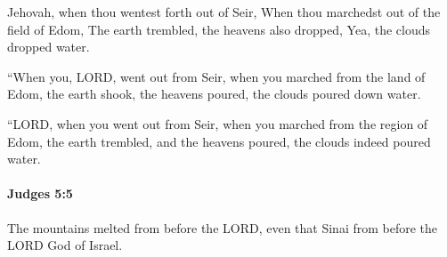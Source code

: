 			\begin{versebox}
					\item[BHS] 
					\item[ASV] Jehovah, when thou wentest forth out of Seir, When thou marchedst out of the field of Edom, The earth trembled, the heavens also dropped, Yea, the clouds dropped water.
					\item[NIV] “When you, LORD, went out from Seir, when you marched from the land of Edom, the earth shook, the heavens poured, the clouds poured down water.
					\item[NRSV] “LORD, when you went out from Seir, when you marched from the region of Edom, the earth trembled, and the heavens poured, the clouds indeed poured water.
			\end{versebox}

		\paragraph{Judges 5:5} %
			\label{JUDGES-5-5}

			The mountains melted from before the LORD, even that Sinai from before the LORD God of Israel.

